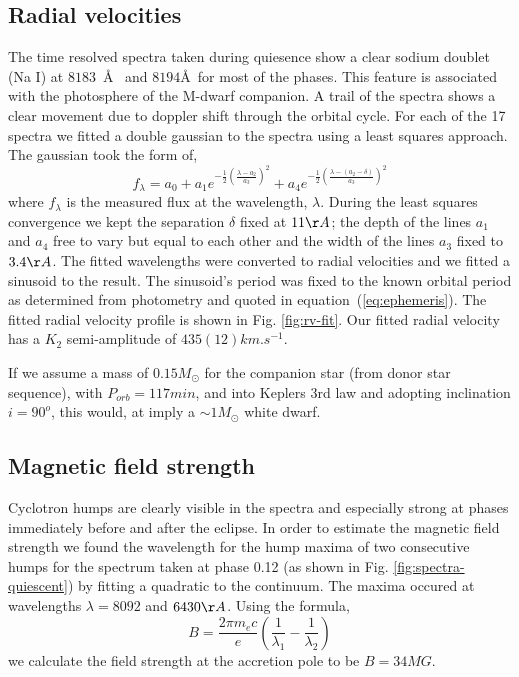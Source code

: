 \documentclass[a4paper,fleqn,usenatbib]{mnras}
\begin{document}
\subsection{Radial velocities}
The time resolved spectra taken during quiesence show a clear sodium doublet (Na I) at $8183$~\AA~ and $8194$\AA \, for most of the phases. This feature is associated with the photosphere of the M-dwarf companion. A trail of the spectra shows a clear movement due to doppler shift through the orbital cycle. For each of the 17 spectra we fitted a double gaussian to the spectra using a least squares approach. The gaussian took the form of, 
\begin{equation}f_\lambda = a_0 + a_1 e^{-\frac{1}{2}(\frac{\lambda - a_2}{a_3})^2} + a_4 e^{-\frac{1}{2}(\frac{\lambda - (a_2 - \delta)}{a_3})^2}  \end{equation}
where $f_\lambda$ is the measured flux at the wavelength, $\lambda$. During the least squares convergence we kept the separation $\delta$ fixed at $11 \AA$; the depth of the lines $a_1$ and $a_4$ free to vary but equal to each other and the width of the lines $a_3$ fixed to $3.4 \AA$. The fitted wavelengths were converted to radial velocities and we fitted a sinusoid to the result. The sinusoid's period was fixed to the known orbital period as determined from photometry and quoted in equation~(\ref{eq:ephemeris}). The fitted radial velocity profile is shown in Fig. \ref{fig:rv-fit}. Our fitted radial velocity has a $K_2$ semi-amplitude of $435(12) km.s^{-1}$. 

If we assume a mass of $0.15M_{\odot}$ for the companion star (from \citet{Knigge2011} donor star sequence), with $P_{orb} = 117min$, and into Keplers 3rd law and adopting inclination $i=90^o$, this would, at imply a $\sim 1M_{\odot}$ white dwarf.


\subsection{Magnetic field strength}
Cyclotron humps are clearly visible in the spectra and especially strong at phases immediately before and after the eclipse. In order to estimate the magnetic field strength we found the wavelength for the hump maxima of two consecutive humps for the spectrum taken at phase 0.12 (as shown in Fig. \ref{fig:spectra-quiescent}) by fitting a quadratic to the continuum. The maxima occured at wavelengths $\lambda  = 8092$ and $6430 \AA$. Using the formula, 
\begin{equation}B = \frac{2 \pi m_e c}{e}(\frac{1}{\lambda_1} - \frac{1}{\lambda_2})\end{equation}
we calculate the field strength at the accretion pole to be $B = 34MG$.
\end{document}
